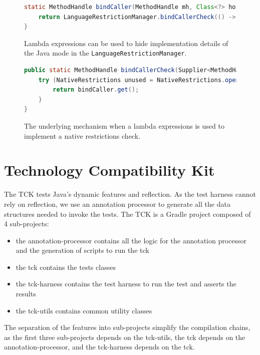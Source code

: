 \begin{figure}[ht]
    \centering
\begin{lstlisting}[language=Java]
static MethodHandle bindCaller(MethodHandle mh, Class<?> hostClass) {
    return LanguageRestrictionManager.bindCallerCheck(() -> BindCaller.bindCaller(mh, hostClass));
}
\end{lstlisting}
    \caption{Lambda expressions can be used to hide implementation details of the Java mode in the \texttt{LanguageRestrictionManager}.}
    \label{fig:bind_caller_lambda}
\end{figure}

\begin{figure}[ht]
    \centering
\begin{lstlisting}[language=Java]
public static MethodHandle bindCallerCheck(Supplier<MethodHandle> bindCaller) {
    try (NativeRestrictions unused = NativeRestrictions.openScope()) {
        return bindCaller.get();
    }
}
\end{lstlisting}
    \caption{The underlying mechanism when a lambda expressions is used to implement a native restrictions check.}
    \label{fig:bind_caller_lrm}
\end{figure}

\section{Technology Compatibility Kit}\label{TCK}
The TCK tests Java's dynamic features and reflection. As the test harness cannot rely on reflection, we use an annotation processor to generate all the data structures needed to invoke the tests. 
The TCK is a Gradle project composed of 4 sub-projects: 
\begin{itemize}
    \item the annotation-processor contains all the logic for the annotation processor and the generation of scripts to run the tck
    \item the tck contains the tests classes
    \item the tck-harness contains the test harness to run the test and asserts the results
    \item the tck-utils contains common utility classes
\end{itemize}
The separation of the features into sub-projects simplify the compilation chains, as the first three sub-projects depends on the tck-utils, the tck depends on the annotation-processor, and the tck-harness depends on the tck.

